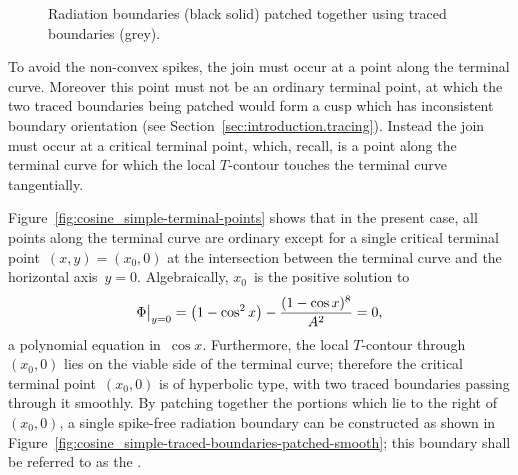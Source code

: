 \begin{figure}
  \newcommand*{\subfigurewidth}{0.36\textwidth}
  \begin{subfigure}[t]{\subfigurewidth}
  \end{subfigure}
  \begin{subfigure}[t]{\subfigurewidth}
  \end{subfigure}
  \caption{
    Radiation boundaries (black solid) patched together
    using traced boundaries (grey).
  }
  \label{fig:cosine_simple-traced-boundaries-patched}
\end{figure}

\begin{figure}
\end{figure}

To avoid the non-convex spikes,
the join must occur at a point along the terminal curve.
Moreover this point must not be an ordinary terminal point,
at which the two traced boundaries being patched
would form a cusp which has inconsistent boundary orientation
(see Section~\ref{sec:introduction.tracing}).
Instead the join must occur at a critical terminal point,
which, recall, is a point along the terminal curve
for which the local $T$-contour touches the terminal curve tangentially.

Figure~\ref{fig:cosine_simple-terminal-points} shows that in the present case,
all points along the terminal curve are ordinary
except for a single critical terminal point~$(x, y) = (x_0, 0)$
at the intersection between the terminal curve
and the horizontal axis~$y = 0$.
Algebraically, $x_0$~is the positive solution to
\begin{equation}
  \eval[\big]{\Phi}_{y=0}
  = \roundbr*{1 - \cos^2 x} - \frac{(1 - \cos x)^8}{A^2}
  = 0,
  \label{eq:cosine-simple-critical-terminal-point-x}
\end{equation}
a polynomial equation in~$\cos x$.
Furthermore, the local $T$-contour through~$(x_0, 0)$
lies on the viable side of the terminal curve;
therefore the critical terminal point~$(x_0, 0)$ is of hyperbolic type,
with two traced boundaries passing through it smoothly.
By patching together the portions which lie to the right of~$(x_0, 0)$,
a single spike-free radiation boundary can be constructed
as shown in Figure~\ref{fig:cosine_simple-traced-boundaries-patched-smooth};
this boundary shall be referred to as the .

